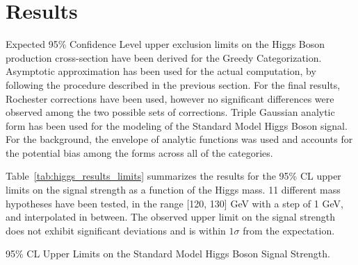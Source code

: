 \section{Results} \label{section:higgs_results}
Expected 95\% Confidence Level upper exclusion limits on the Higgs Boson production cross-section have been derived for the Greedy Categorization. Asymptotic approximation has been used for the actual computation, by following the procedure described in the previous section. For the final results, Rochester corrections have been used, however no significant differences were observed among the two possible sets of corrections. Triple Gaussian analytic form has been used for the modeling of the Standard Model Higgs Boson signal. For the background, the envelope of analytic functions was used and accounts for the potential bias among the forms across all of the categories.

Table~\ref{tab:higgs_results_limits} summarizes the results for the 95\% CL upper limits on the signal strength as a function of the Higgs mass. 11 different mass hypotheses have been tested, in the range [120, 130] GeV with a step of 1 GeV, and interpolated in between. The observed upper limit on the signal strength does not exhibit significant deviations and is within $1\sigma$ from the expectation.
\begin{table}[htbp]
    \centering
    \caption{95\% CL Upper Limits on the Standard Model Higgs Boson Signal Strength.}
    
    \label{tab:higgs_results_limits}
\end{table}

